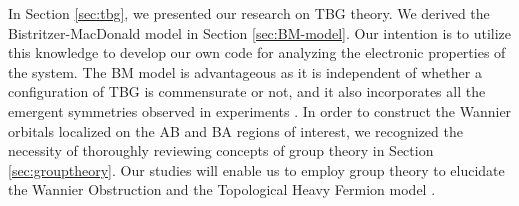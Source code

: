 \documentclass[12pt]{report}
\begin{document}
In Section \ref{sec:tbg}, we presented our research on TBG theory. We derived the Bistritzer-MacDonald model \cite{macdonald2011} in Section \ref{sec:BM-model}. Our intention is to utilize this knowledge to develop our own code for analyzing the electronic properties of the system. The BM model is advantageous as it is independent of whether a configuration of TBG is commensurate or not, and it also incorporates all the emergent symmetries observed in experiments \cite{zou2018}. In order to construct the Wannier orbitals localized on the AB and BA regions of interest, we recognized the necessity of thoroughly reviewing concepts of group theory in Section \ref{sec:grouptheory}. Our studies will enable us to employ group theory to elucidate the Wannier Obstruction and the Topological Heavy Fermion model \cite{topoheavyfermion2022}.

%




\end{document}
